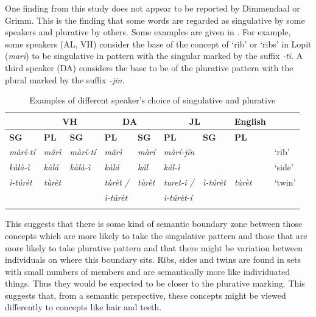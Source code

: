 \documentclass[output=paper]{langsci/langscibook}
\begin{document}
One finding from this study does not appear to be reported by Dimmendaal or Grimm. This is the finding that some words are regarded as singulative by some speakers and plurative by others. Some examples are given in . For example, some speakers (AL, VH) consider the base of the concept of ‘rib’ or ‘ribs’ in Lopit (\textit{mari}) to be singulative in pattern with the singular marked by the suffix \textit{-ti}. A third speaker (DA) considers the base to be of the plurative pattern with the plural marked by the suffix \textit{-jin}. 

\begin{table}
\begin{tabularx}{\textwidth}{lllllllll}
\lsptoprule

\multicolumn{2}{c}{ \textbf{AL}} & \multicolumn{2}{c}{ \textbf{VH}} & \multicolumn{2}{c}{ \textbf{DA}} & \multicolumn{2}{c}{ \textbf{JL}} & \textbf{English}\\ \midrule
\textbf{SG} & \textbf{PL} & \textbf{SG} & \textbf{PL} & \textbf{SG} & \textbf{PL} & \textbf{SG} & 
 \textbf{PL} & \\ \midrule
\itshape m\`{a}r\'{i}-t\'{i} & \itshape m\^{a}r\`{i} & \itshape m\`{a}r\'{i}-t\'{i} & \itshape m\^{a}r\`{i} & \itshape m\`{a}r\'{i} & \itshape m\`{a}r\'{i}-j\'{i}n &  &  & ‘rib’\\
\itshape k\`{a}l\`{a}-\`{i} & \itshape k\`{a}l\'{a} & \itshape k\`{a}l\`{a}-\`{i} & \itshape k\`{a}l\'{a} & \itshape k\'{a}l & \itshape k\'{a}l-\`{i} &  &  & ‘side’\\
\itshape \`{i}-t\'{u}r\`{e}t & \itshape t\`{u}r\`{e}t &  & \itshape t\`{u}r\`{e}t / & {\itshape t\`{u}r\`{e}t } & {\itshape turet-i /}

& \itshape \`{i}-t\'{u}r\`{e}t & \itshape t\`{u}r\`{e}t & ‘twin’\\
&&& \itshape \`{i}-t\'{u}r\`{e}t && \itshape \`{i}-t\'{u}r\`{e}t-\'{i} & & \\
\lspbottomrule
\end{tabularx}
\caption{Examples of different speaker’s choice of singulative and plurative}
\label{tab:moodie:8}
\end{table}

This suggests that there is some kind of semantic boundary zone between those concepts which are more likely to take the singulative pattern and those that are more likely to take plurative pattern and that there might be variation between individuals on where this boundary sits. Ribs, sides and twins are found in sets with small numbers of members and are semantically more like individuated things. Thus they would be expected to be closer to the plurative marking. This suggests that, from a semantic perspective, these concepts might be viewed differently to concepts like hair and teeth.
\end{document}
